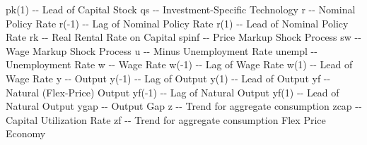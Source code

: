 \documentclass{article}%
\begin{document}
pk(1)       {-}{-}  Lead of Capital Stock\newline%
qs          {-}{-}  Investment{-}Specific Technology\newline%
r           {-}{-}  Nominal Policy Rate\newline%
r({-}1)       {-}{-}  Lag of Nominal Policy Rate\newline%
r(1)        {-}{-}  Lead of Nominal Policy Rate\newline%
rk          {-}{-}  Real Rental Rate on Capital\newline%
spinf       {-}{-}  Price Markup Shock Process\newline%
sw          {-}{-}  Wage Markup Shock Process\newline%
u           {-}{-}  Minus Unemployment Rate\newline%
unempl      {-}{-}  Unemployment Rate\newline%
w           {-}{-}  Wage Rate\newline%
w({-}1)       {-}{-}  Lag of Wage Rate\newline%
w(1)        {-}{-}  Lead of Wage Rate\newline%
y           {-}{-}  Output\newline%
y({-}1)       {-}{-}  Lag of Output\newline%
y(1)        {-}{-}  Lead of Output\newline%
yf          {-}{-}  Natural (Flex{-}Price) Output\newline%
yf({-}1)      {-}{-}  Lag of Natural Output\newline%
yf(1)       {-}{-}  Lead of Natural Output\newline%
ygap        {-}{-}  Output Gap\newline%
z           {-}{-}  Trend for aggregate consumption\newline%
zcap        {-}{-}  Capital Utilization Rate\newline%
zf          {-}{-}  Trend for aggregate consumption Flex Price Economy

%
\end{document}
